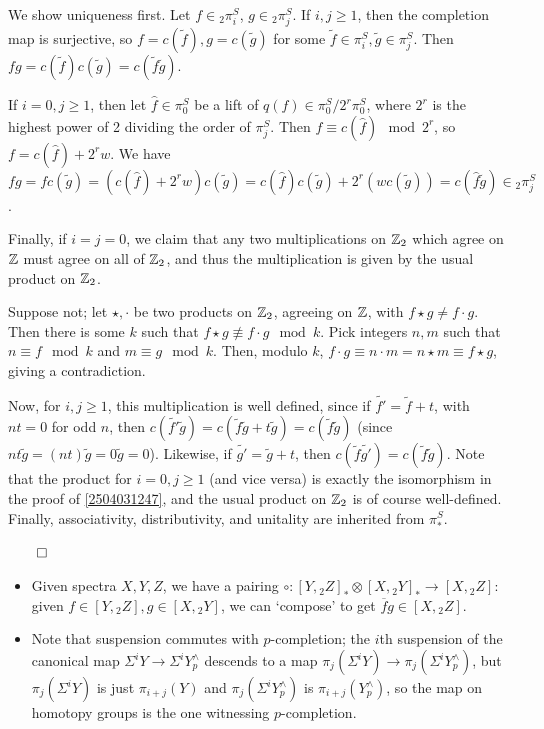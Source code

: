 \documentclass{MetricNotes2023}
\def\inte{\ensuremath\mathbb{Z}}
\def\done{\begin{flushright}\vspace{-4.35ex}\(\qed\)\end{flushright}}
\begin{document}
\begin{ourproof}
We show uniqueness first. Let \(f \in \text{}_2\pi_i^S\), \(g \in \text{}_2\pi_j^S\). If \(i,j \geq 1\), then the completion map is surjective, so \(f=c(\tilde f), g = c(\tilde g)\) for some \(\tilde f \in \pi_i^S, \tilde g \in \pi_j^S\). Then \(fg=c(\tilde f)c(\tilde g)=c(\tilde f \tilde g)\).

If \(i=0, j\geq 1\), then let \(\hat f\in \pi_0^S\) be a lift of \(q(f)\in \pi_0^S/2^r\pi_0^S\), where \(2^r\) is the highest power of 2 dividing the order of \(\pi_j^S\). Then \(f\equiv c(\hat f) \mod 2^r\), so \(f=c(\hat f) + 2^rw\). We have \(fg=fc(\tilde g)=(c(\hat f) + 2^r w)c(\tilde g)=c(\hat f) c(\tilde g)+2^r(wc(\tilde g))=c(\hat f \tilde g)\in \text{}_2\pi_j^S\). 

Finally, if \(i=j=0\), we claim that any two multiplications on \(\inte_2\) which agree on \(\inte\) must agree on all of \(\inte_2\), and thus the multiplication is given by the usual product on \(\inte_2\). 

Suppose not; let \(\star, \cdot\) be two products on \(\inte_2\), agreeing on \(\inte\), with \(f\star g \neq f \cdot g\). Then there is some \(k\) such that \(f \star g \not\equiv f \cdot g \mod k\). Pick integers \(n, m\) such that \(n\equiv f \mod k\) and \(m \equiv g \mod k\). Then, modulo \(k\), \(f\cdot g \equiv n\cdot m =n\star m \equiv f \star g\), giving a contradiction.

Now, for \(i, j \geq 1\), this multiplication is well defined, since if \(\tilde{f'}=\tilde f+t\), with \(nt=0\) for odd \(n\), then \(c(\tilde{f'}\tilde g)=c(\tilde f \tilde g + t\tilde g)=c(\tilde f \tilde g)\) (since \(nt\tilde g=(nt)\tilde g = 0\tilde g = 0\)). Likewise, if \(\tilde{g'}=\tilde g + t\), then \(c(\tilde f \tilde{g'})=c(\tilde f \tilde g)\). Note that the product for \(i=0, j \geq 1\)  (and vice versa) is exactly the isomorphism in the proof of \ref{2504031247}, and the usual product on \(\inte_2\) is of course well-defined. Finally, associativity, distributivity, and unitality are inherited from \(\pi_*^S\). \done
\end{ourproof}

\begin{itemize}
\item Given spectra \(X, Y, Z\), we have a pairing \(\circ : [Y, \text{}_2Z]_* \otimes [X,\text{}_2Y]_* \to [X, \text{}_2Z]\): given \(f \in [Y, \text{}_2Z], g \in [X, \text{}_2Y]\), we can `compose' to get \(\overline fg\in [X, \text{}_2Z]\). 

\item Note that suspension commutes with \(p\)-completion; the \(i\)th suspension of the canonical map \(\Sigma^i Y \to \Sigma^iY^\wedge_p\) descends to a map \(\pi_j(\Sigma^iY)\to \pi_j(\Sigma^iY^\wedge_p)\), but \(\pi_j(\Sigma^iY)\) is just \(\pi_{i+j}(Y)\) and \(\pi_{j}(\Sigma^i Y^\wedge_p)\) is \(\pi_{i+j}(Y^\wedge_p)\), so the map on homotopy groups is the one witnessing \(p\)-completion. 
\end{itemize}
\end{document}
